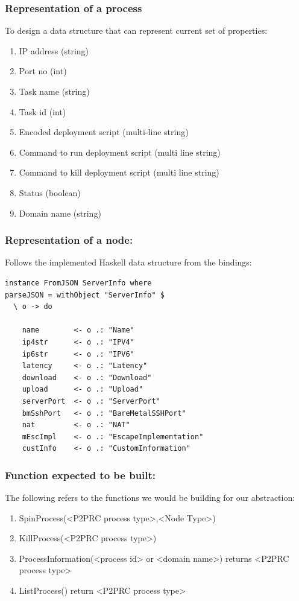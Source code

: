 \documentclass[11pt]{article}
\begin{document}
\subsubsection{Representation of a process}
\label{sec:orgd88a8e7}
To design a data structure that can represent current set of properties:
\begin{enumerate}
\item IP address (string)
\item Port no (int)
\item Task name (string)
\item Task id (int)
\item Encoded deployment script (multi-line string)
\item Command to run deployment script (multi line string)
\item Command to kill deployment script (multi line string)
\item Status (boolean)
\item Domain name (string)
\end{enumerate}

\subsubsection{Representation of a node:}
\label{sec:orga084f25}
Follows the implemented Haskell data structure from the bindings:
\begin{verbatim}
instance FromJSON ServerInfo where
parseJSON = withObject "ServerInfo" $
  \ o -> do

    name        <- o .: "Name"
    ip4str      <- o .: "IPV4"
    ip6str      <- o .: "IPV6"
    latency     <- o .: "Latency"
    download    <- o .: "Download"
    upload      <- o .: "Upload"
    serverPort  <- o .: "ServerPort"
    bmSshPort   <- o .: "BareMetalSSHPort"
    nat         <- o .: "NAT"
    mEscImpl    <- o .: "EscapeImplementation"
    custInfo    <- o .: "CustomInformation"
\end{verbatim}

\subsubsection{Function expected to be built:}
\label{sec:org4644889}
The following refers to the functions we would be building for our abstraction:
\begin{enumerate}
\item SpinProcess(<P2PRC process type>,<Node Type>)
\item KillProcess(<P2PRC process type>)
\item ProcessInformation(<process id> or <domain name>) returns <P2PRC process type>
\item ListProcess() return <P2PRC process type>
\end{enumerate}
\end{document}
